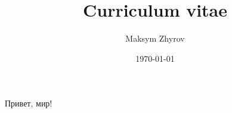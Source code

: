 \documentclass[a4paper,12pt]{article}
\author{Maksym Zhyrov}
\title{Curriculum vitae}
\date{\today}
\begin{document}
Привет, мир!
\end{document}
